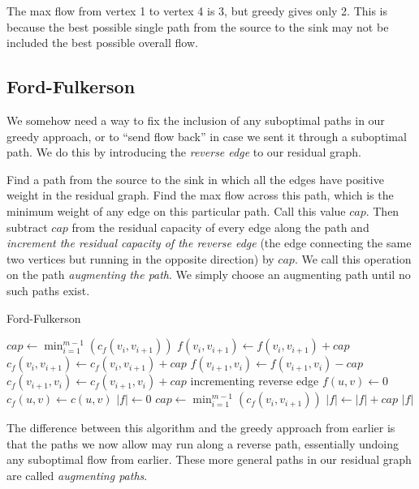 The max flow from vertex 1 to vertex 4 is 3, but greedy gives only 2. This is because the best possible single path from the source to the sink may not be included the best possible overall flow.

\subsection{Ford-Fulkerson}

We somehow need a way to fix the inclusion of any suboptimal paths in our greedy approach, or to ``send flow back'' in case we sent it through a suboptimal path. We do this by introducing the \textit{reverse edge} to our residual graph.

Find a path from the source to the sink in which all the edges have positive weight in the residual graph. Find the max flow across this path, which is the minimum weight of any edge on this particular path. Call this value $cap$. Then subtract $cap$ from the residual capacity of every edge along the path and \textit{increment the residual capacity of the reverse edge} (the edge connecting the same two vertices but running in the opposite direction) by $cap$. We call this operation on the path \textit{augmenting the path}. We simply choose an augmenting path until no such paths exist.

\begin{algorithm}[H]
\caption{Ford-Fulkerson}
\begin{algorithmic}
\State $cap \gets \min_{i=1}^{m-1}(c_f(v_i,v_{i+1}))$
	\State $f(v_i,v_{i+1}) \gets f(v_i,v_{i+1}) + cap$
	\State $c_f(v_i,v_{i+1}) \gets c_f(v_i,v_{i+1}) + cap$
	\State $f(v_{i+1},v_i) \gets f(v_{i+1},v_i) - cap$
	\State $c_f(v_{i+1},v_i) \gets c_f(v_{i+1},v_i) + cap$
	\Comment incrementing reverse edge
\EndFor
\EndFunction
{}
		\State $f(u,v) \gets 0$
		\State $c_f(u,v) \gets c(u,v)$
	\EndFor
	\State $|f| \gets 0$
		\State $cap \gets \min_{i=1}^{m-1}(c_f(v_i,v_{i+1}))$
		\State $|f| \gets |f| + cap$
		\State {}
	\EndWhile
	\Return $|f|$
\EndFunction
\end{algorithmic}
\end{algorithm}

The difference between this algorithm and the greedy approach from earlier is that the paths we now allow may run along a reverse path, essentially undoing any suboptimal flow from earlier. These more general paths in our residual graph are called \textit{augmenting paths}.

